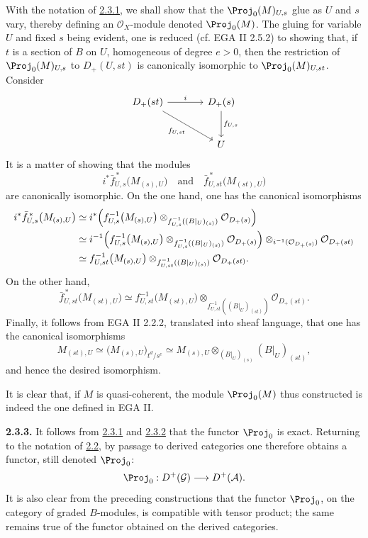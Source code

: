 With the notation of \hyperlink{sga6.e06.para.2-3-1}{2.3.1}, we shall show that the \(\Proj_0(M)_{U,s}\) glue as \(U\) and \(s\) vary, thereby defining an \(\mathcal O_X\)-module denoted \(\Proj_0(M)\). The gluing for variable \(U\) and fixed \(s\) being evident, one is reduced (cf. EGA II 2.5.2) to showing that, if \(t\) is a section of \(B\) on \(U\), homogeneous of degree \(e>0\), then the restriction of \(\Proj_0(M)_{U,s}\) to \(D_+(U,st)\) is canonically isomorphic to \(\Proj_0(M)_{U,st}\). Consider
\[
\begin{tikzcd}[column sep=large,row sep=large]
D_+(st) \arrow[r,"i"] \arrow[dr,"f_{U,st}"'] &
D_+(s) \arrow[d,"f_{U,s}"]\\
& U
\end{tikzcd}
\]
It is a matter of showing that the modules
\[
  i^*\bar f_{U,s}^{\,*}\bigl(M_{(s),U}\bigr)
  \quad\text{and}\quad
  \bar f_{U,st}^{\,*}\bigl(M_{(st),U}\bigr)
\]
are canonically isomorphic. On the one hand, one has the canonical isomorphisms
\[
\begin{aligned}
i^*\bar f_{U,s}^{\,*}\bigl(M_{(s),U}\bigr)
&\simeq
i^*\Bigl(f_{U,s}^{-1}\bigl(M_{(s),U}\bigr)
 \otimes_{f_{U,s}^{-1}((B|_U)_{(s)})}\mathcal O_{D_+(s)}\Bigr)\\
&\simeq
i^{-1}\Bigl(f_{U,s}^{-1}\bigl(M_{(s),U}\bigr)
 \otimes_{f_{U,s}^{-1}((B|_U)_{(s)})}\mathcal O_{D_+(s)}\Bigr)
 \otimes_{i^{-1}(\mathcal O_{D_+(s)})}\mathcal O_{D_+(st)}\\
&\simeq
f_{U,st}^{-1}\bigl(M_{(s),U}\bigr)
 \otimes_{f_{U,st}^{-1}((B|_U)_{(s)})}\mathcal O_{D_+(st)} .
\end{aligned}
\]
On the other hand,
\[
  \bar f_{U,st}^{\,*}\bigl(M_{(st),U}\bigr)
  \simeq
  f_{U,st}^{-1}\bigl(M_{(st),U}\bigr)
  \otimes_{f_{U,st}^{-1}((B|_U)_{(st)})}\mathcal O_{D_+(st)} .
\]
Finally, it follows from EGA II 2.2.2, translated into sheaf language, that one has the canonical isomorphisms
\[
  M_{(st),U}\simeq
  \bigl(M_{(s),U}\bigr)_{t^d/s^e}
  \simeq
  M_{(s),U}\otimes_{(B|_U)_{(s)}}(B|_U)_{(st)},
\]
and hence the desired isomorphism.

It is clear that, if \(M\) is quasi-coherent, the module \(\Proj_0(M)\) thus constructed is indeed the one defined in EGA II.

\textbf{2.3.3.} It follows from \hyperlink{sga6.e06.para.2-3-1}{2.3.1} and \hyperlink{sga6.e06.para.2-3-2}{2.3.2} that the functor \(\Proj_0\) is exact. Returning to the notation of \hyperlink{sga6.e06.sec.2.2}{2.2}, by passage to derived categories one therefore obtains a functor, still denoted \(\Proj_0\):
\[
  \Proj_0:D^+(\mathcal G)\longrightarrow D^+(\mathcal A).
\]
It is also clear from the preceding constructions that the functor \(\Proj_0\), on the category of graded \(B\)-modules, is compatible with tensor product; the same remains true of the functor obtained on the derived categories.

